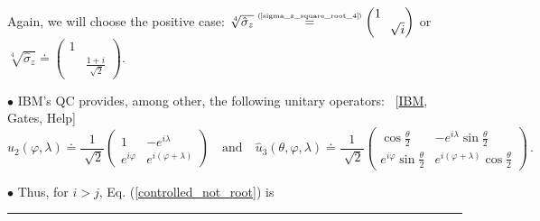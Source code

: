 \documentclass[11pt]{article}
\numberwithin{equation}{section} %
\numberwithin{figure}{section} %
\newcommand\numeq[1] %
  {\stackrel{\scriptscriptstyle(\mkern-1.5mu#1\mkern-1.5mu)}{=}}
\begin{document}
\begin{appendices}
\begin{equation}
\begin{split}
\end{split}
\end{equation}Again, we will choose the positive case: $\sqrt[4]{\hat{\sigma}_z} \numeq{\textrm{\ref{sigma_z_square_root_4}}} \begin{pmatrix} 1&\\&\sqrt[]{i}\end{pmatrix}$ or $\sqrt[4]{\hat{\sigma}_z} \doteq \begin{pmatrix} 1&\\&\frac{1+i}{\sqrt[]{2}}\end{pmatrix}$.

\vspace{1cm}
\noindent $\bullet$ IBM's QC provides, among other, the following unitary operators: $\,$ [\href{https://quantumexperience.ng.bluemix.net/qx/editor}{IBM}, Gates, Help]
\begin{equation} \label{IBM_u_gates}
\hat{u}_2 (\varphi,\lambda)\doteq \frac{1}{\sqrt[]{2}}\begin{pmatrix} 1&-e^{i\lambda}\\e^{i\varphi}&e^{i(\varphi+\lambda)} \end{pmatrix} \quad \textrm{and} \quad \hat{u}_3 (\theta,\varphi,\lambda)\doteq \frac{1}{\sqrt[]{2}}\begin{pmatrix} \cos\frac{\theta}{2}&-e^{i\lambda}\sin\frac{\theta}{2}\\e^{i\varphi}\sin\frac{\theta}{2}&e^{i(\varphi+\lambda)}\cos\frac{\theta}{2} \end{pmatrix}\,\textrm{.}
\end{equation}



\noindent $\bullet$ Thus, for $i>j$, Eq. (\ref{controlled_not_root}) is
\noindent
{\color{red} \rule{\linewidth}{0.5mm} }


\end{appendices}
\end{document}
